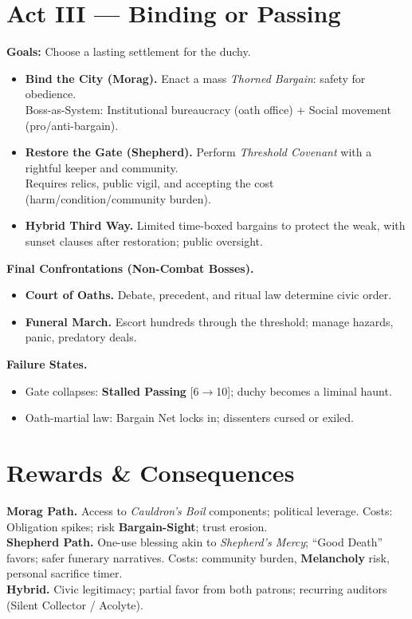 \documentclass[11pt]{article}
\newcommand{\timer}[1]{\textsc{[#1]}}
\begin{document}
\section*{Act III --- Binding or Passing}
\textbf{Goals:} Choose a lasting settlement for the duchy.
\begin{itemize}
  \item \textbf{Bind the City (Morag).} Enact a mass \textit{Thorned Bargain}: safety for obedience.\\
  Boss-as-System: Institutional bureaucracy (oath office) + Social movement (pro/anti-bargain).
  \item \textbf{Restore the Gate (Shepherd).} Perform \textit{Threshold Covenant} with a rightful keeper and community.\\
  Requires relics, public vigil, and accepting the cost (harm/condition/community burden).
  \item \textbf{Hybrid Third Way.} Limited time-boxed bargains to protect the weak, with sunset clauses after restoration; public oversight.
\end{itemize}
\textbf{Final Confrontations (Non-Combat Bosses).}
\begin{itemize}
  \item \textbf{Court of Oaths.} Debate, precedent, and ritual law determine civic order.
  \item \textbf{Funeral March.} Escort hundreds through the threshold; manage hazards, panic, predatory deals.
\end{itemize}
\textbf{Failure States.}
\begin{itemize}
  \item Gate collapses: \textbf{Stalled Passing} \timer{6$\to$10}; duchy becomes a liminal haunt.
  \item Oath-martial law: Bargain Net locks in; dissenters cursed or exiled.
\end{itemize}

\section*{Rewards \& Consequences}
\textbf{Morag Path.} Access to \textit{Cauldron's Boil} components; political leverage. Costs: Obligation spikes; risk \textbf{Bargain-Sight}; trust erosion.\\
\textbf{Shepherd Path.} One-use blessing akin to \textit{Shepherd's Mercy}; ``Good Death'' favors; safer funerary narratives. Costs: community burden, \textbf{Melancholy} risk, personal sacrifice timer.\\
\textbf{Hybrid.} Civic legitimacy; partial favor from both patrons; recurring auditors (Silent Collector / Acolyte).
\end{document}
